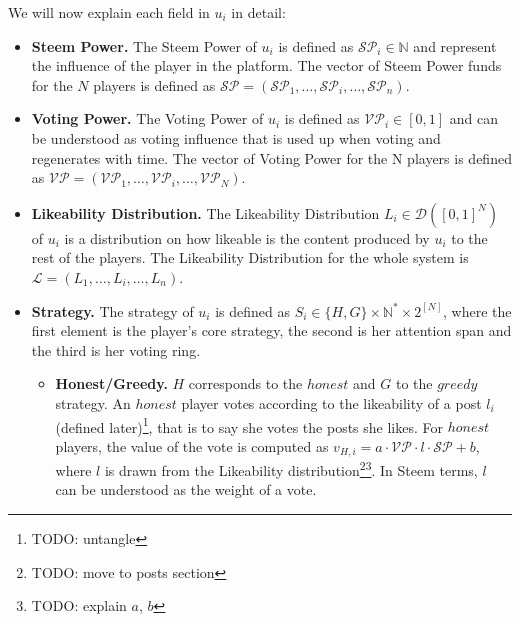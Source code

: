       We will now explain each field in $u_i$ in detail:
      \begin{itemize}
        \item \textbf{Steem Power.} The Steem Power of $u_i$ is defined as
        $\mathcal{SP}_{i} \in \mathbb{N}$ and represent the influence of the
        player in the platform. The vector of Steem Power funds for the $N$
        players is defined as $\mathcal{\mathcal{SP}} = \left(\mathcal{SP}_{1},
        \dots, \mathcal{SP}_{i}, \dots, \mathcal{SP}_{n}\right)$.
        \item \textbf{Voting Power.} The Voting Power of $u_i$ is defined as
        $\mathcal{VP}_i \in \left[0, 1\right]$ and can be understood as  voting
        influence that is used up when voting and regenerates with time. The
        vector of Voting Power for the N players is defined as $\mathcal{VP} =
        \left(\mathcal{VP}_1, \dots, \mathcal{VP}_i, \dots,
        \mathcal{VP}_N\right)$.

        \item \textbf{Likeability Distribution.} The Likeability Distribution
        $L_i\in \mathcal{D}\left([0,1]^N\right)$ of $u_i$ is a distribution on
        how likeable is the content produced by $u_i$ to the rest of the
        players. The Likeability Distribution for the whole system is
        $\mathcal{L} = \left(L_1, \dots, L_i, \dots, L_n\right)$.

        \item \textbf{Strategy.} The strategy of $u_i$ is defined as $S_i \in
        \lbrace H, G \rbrace \times \mathbb{N}^* \times 2^{\left[N\right]}$,
        where the first element is the player's core strategy, the second is her
        attention span and the third is her voting ring.
        \begin{itemize}
          \item \textbf{Honest/Greedy.} $H$ corresponds to the $honest$ and $G$
          to the $greedy$ strategy. An $honest$ player votes according to the
          likeability of a post $l_i$ (defined later)\footnote{TODO: untangle},
          that is to say she votes the posts she likes. For $honest$ players, the
          value of the vote is computed as $v_{H,i} = a \cdot \mathcal{VP} \cdot
          l \cdot \mathcal{SP} + b$, where $l$ is drawn from the Likeability
          distribution\footnote{TODO: move to posts section}\footnote{TODO:
          explain $a$, $b$}. In Steem terms, $l$ can be understood as the weight
          of a vote.


\end{itemize}
\end{itemize}
